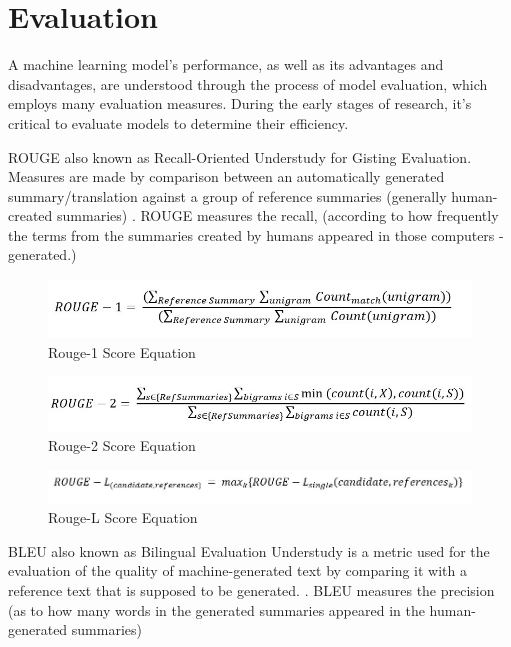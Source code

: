 \documentclass[conference]{IEEEtran}
\begin{document}
\section{Evaluation}
A machine learning model's performance, as well as its advantages and disadvantages, are understood through the process of model evaluation, which employs many evaluation measures. During the early stages of research, it's critical to evaluate models to determine their efficiency.

ROUGE also known as Recall-Oriented Understudy for Gisting Evaluation. Measures are made by comparison between an automatically generated summary/translation against a group of reference summaries (generally human-created summaries) \cite{lin_2004}.  ROUGE measures the recall, (according to how frequently the terms from the summaries created by humans appeared in those computers - generated.)


\begin{figure}[htbp]
\centerline{\includegraphics[width=\linewidth]{images/rouge-1.jpg}}
\caption{Rouge-1 Score Equation}
\label{fig:trait-content-output}
\end{figure}

\begin{figure}[htbp]
\centerline{\includegraphics[width=\linewidth]{images/rouge-2.jpg}}
\caption{Rouge-2 Score Equation}
\label{fig:trait-content-output}
\end{figure}

\begin{figure}[htbp]
\centerline{\includegraphics[width=\linewidth]{images/rouge-l.jpg}}
\caption{Rouge-L Score Equation}
\label{fig:trait-content-output}
\end{figure}

BLEU also known as Bilingual Evaluation Understudy is a metric used for the evaluation of the quality of machine-generated text by comparing it with a reference text that is supposed to be generated. \cite{steinberger_ježek}. BLEU measures the precision (as to how many words in the generated summaries appeared in the human-generated summaries)
\end{document}
